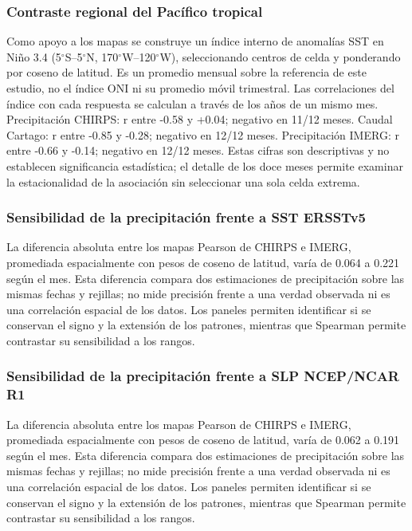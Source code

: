 \documentclass[10pt,a4paper]{article}
\begin{document}
\subsubsection*{Contraste regional del Pacífico tropical}
Como apoyo a los mapas se construye un índice interno de anomalías SST en Niño 3.4 (5$^\circ$S–5$^\circ$N, 170$^\circ$W–120$^\circ$W), seleccionando centros de celda y ponderando por coseno de latitud. Es un promedio mensual sobre la referencia de este estudio, no el índice ONI ni su promedio móvil trimestral. Las correlaciones del índice con cada respuesta se calculan a través de los años de un mismo mes. Precipitación CHIRPS: r entre -0.58 y +0.04; negativo en 11/12 meses. Caudal Cartago: r entre -0.85 y -0.28; negativo en 12/12 meses. Precipitación IMERG: r entre -0.66 y -0.14; negativo en 12/12 meses. Estas cifras son descriptivas y no establecen significancia estadística; el detalle de los doce meses permite examinar la estacionalidad de la asociación sin seleccionar una sola celda extrema.

\subsubsection*{Sensibilidad de la precipitación frente a SST ERSSTv5}
La diferencia absoluta entre los mapas Pearson de CHIRPS e IMERG, promediada espacialmente con pesos de coseno de latitud, varía de 0.064 a 0.221 según el mes. Esta diferencia compara dos estimaciones de precipitación sobre las mismas fechas y rejillas; no mide precisión frente a una verdad observada ni es una correlación espacial de los datos. Los paneles permiten identificar si se conservan el signo y la extensión de los patrones, mientras que Spearman permite contrastar su sensibilidad a los rangos.

\subsubsection*{Sensibilidad de la precipitación frente a SLP NCEP/NCAR R1}
La diferencia absoluta entre los mapas Pearson de CHIRPS e IMERG, promediada espacialmente con pesos de coseno de latitud, varía de 0.062 a 0.191 según el mes. Esta diferencia compara dos estimaciones de precipitación sobre las mismas fechas y rejillas; no mide precisión frente a una verdad observada ni es una correlación espacial de los datos. Los paneles permiten identificar si se conservan el signo y la extensión de los patrones, mientras que Spearman permite contrastar su sensibilidad a los rangos.
\end{document}
